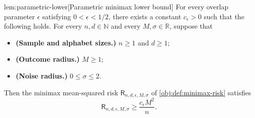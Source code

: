 \documentclass[11pt]{article}
\begin{document}
\begin{lemmav}{lem:parametric-lower}[Parametric minimax lower bound]
For every overlap parameter \(\epsilon\) satisfying \(0<\epsilon<1/2\), there exists a constant \(c_{\epsilon}>0\) such that the following holds. For every \(n,d\in\mathbb N\) and every \(M,\sigma\in\mathbb R\), suppose that
\begin{itemize}
\item \textbf{(Sample and alphabet sizes.)} \(n\ge 1\) and \(d\ge 1\);
\item \textbf{(Outcome radius.)} \(M\ge 1\);
\item \textbf{(Noise radius.)} \(0\le \sigma\le 2\).
\end{itemize}
Then the minimax mean-squared risk \(\mathsf R_{n,d,\epsilon,M,\sigma}\) of \cref{obj:def:minimax-risk} satisfies
\[
\mathsf R_{n,d,\epsilon,M,\sigma}\ge \frac{c_{\epsilon}M^2}{n}.
\]
\end{lemmav}
\end{document}
